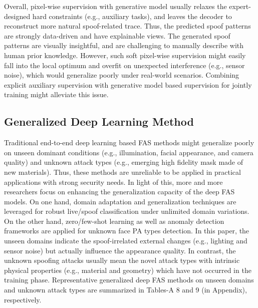 \documentclass[10pt,journal,compsoc]{IEEEtran}
\begin{document}
Overall, pixel-wise supervision with generative model usually relaxes the expert-designed hard constraints (e.g., auxiliary tasks), and leaves the decoder to reconstruct more natural spoof-related trace. Thus, the predicted spoof patterns are strongly data-driven and have explainable views. The generated spoof patterns are visually insightful, and are challenging to manually describe with human prior knowledge. However, such soft pixel-wise supervision might easily fall into the local optimum and overfit on unexpected interference (e.g., sensor noise), which would generalize poorly under real-world scenarios. Combining explicit auxiliary supervision with generative model based supervision for jointly training might alleviate this issue.





\subsection{Generalized Deep Learning Method}









Traditional end-to-end deep learning based FAS methods might generalize poorly on unseen dominant conditions (e.g., illumination, facial appearance, and camera quality) and unknown attack types (e.g., emerging high fidelity mask made of new materials). Thus, these methods are unreliable to be applied in practical applications with strong security needs. In light of this, more and more researchers focus on enhancing the generalization capacity of the deep FAS models. On one hand, domain adaptation and generalization techniques are leveraged for robust live/spoof classification under unlimited domain variations. On the other hand, zero/few-shot learning as well as anomaly detection frameworks are applied for unknown face PA types detection. In this paper, the unseen domains indicate the spoof-irrelated external changes (e.g., lighting and sensor noise) but actually influence the appearance quality. In contrast, the unknown spoofing attacks usually mean the novel attack types with intrinsic physical properties (e.g., material and geometry) which have not occurred in the training phase. Representative generalized deep FAS methods on unseen domains and unknown attack types are summarized in Tables-A 8 and 9 (in Appendix), respectively.  
\end{document}
